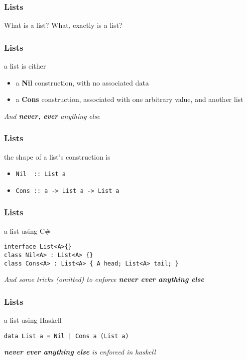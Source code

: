\begin{frame}
\frametitle{Lists}
\begin{block}{What is a list?}
What, exactly is a list?
\end{block}
\end{frame}

\begin{frame}
\frametitle{Lists}
\begin{block}{a list is either}
\begin{itemize}
\item a \textbf{Nil} construction, with no associated data
\item a \textbf{Cons} construction, associated with one arbitrary value, and another list
\end{itemize}
\end{block}
\emph{And \textbf{never, ever} anything else}
\end{frame}

\begin{frame}
\frametitle{Lists}
\begin{block}{the shape of a list's construction is}
\begin{itemize}
\item \lstinline{Nil  :: List a}
\item \lstinline{Cons :: a -> List a -> List a}
\end{itemize}
\end{block}
\end{frame}

\begin{frame}[fragile]
\frametitle{Lists}
\begin{block}{a list using C\#}
\begin{lstlisting}[style=csharp,basicstyle=\scriptsize\ttfamily,mathescape]
interface List<A>{}
class Nil<A> : List<A> {}
class Cons<A> : List<A> { A head; List<A> tail; }
\end{lstlisting}
\end{block}
\tiny{\emph{And some tricks (omitted) to enforce \textbf{never ever anything else}}}
\end{frame}

\begin{frame}[fragile]
\frametitle{Lists}
\begin{block}{a list using Haskell}
\begin{lstlisting}[style=haskell,basicstyle=\scriptsize\ttfamily,mathescape]
data List a = Nil | Cons a (List a)
\end{lstlisting}
\end{block}
\tiny{\emph{\textbf{never ever anything else} is enforced in haskell}}
\end{frame}

